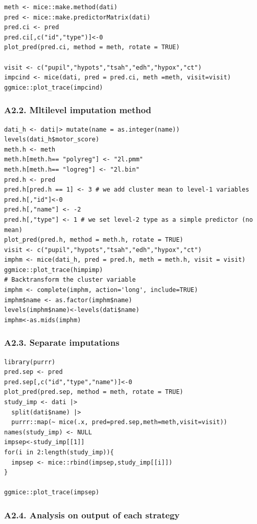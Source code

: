 \documentclass[
  article]{jss}
\begin{document}
\begin{verbatim}
meth <- mice::make.method(dati)
pred <- mice::make.predictorMatrix(dati)
pred.ci <- pred
pred.ci[,c("id","type")]<-0
plot_pred(pred.ci, method = meth, rotate = TRUE) 

visit <- c("pupil","hypots","tsah","edh","hypox","ct")
impcind <- mice(dati, pred = pred.ci, meth =meth, visit=visit)
ggmice::plot_trace(impcind)
\end{verbatim}

\subsubsection{A2.2. Mltilevel imputation
method}\label{a2.2.-mltilevel-imputation-method}

\begin{verbatim}
dati_h <- dati|> mutate(name = as.integer(name))
levels(dati_h$motor_score)
meth.h <- meth
meth.h[meth.h== "polyreg"] <- "2l.pmm"
meth.h[meth.h== "logreg"] <- "2l.bin"
pred.h <- pred
pred.h[pred.h == 1] <- 3 # we add cluster mean to level-1 variables
pred.h[,"id"]<-0
pred.h[,"name"] <- -2
pred.h[,"type"] <- 1 # we set level-2 type as a simple predictor (no mean)
plot_pred(pred.h, method = meth.h, rotate = TRUE) 
visit <- c("pupil","hypots","tsah","edh","hypox","ct")
imphm <- mice(dati_h, pred = pred.h, meth = meth.h, visit = visit)
ggmice::plot_trace(himpimp)
# Backtransform the cluster variable
imphm <- complete(imphm, action='long', include=TRUE)
imphm$name <- as.factor(imphm$name)
levels(imphm$name)<-levels(dati$name)
imphm<-as.mids(imphm)
\end{verbatim}

\subsubsection{A2.3. Separate
imputations}\label{a2.3.-separate-imputations}

\begin{verbatim}
library(purrr)
pred.sep <- pred
pred.sep[,c("id","type","name")]<-0
plot_pred(pred.sep, method = meth, rotate = TRUE) 
study_imp <- dati |> 
  split(dati$name) |> 
  purrr::map(~ mice(.x, pred=pred.sep,meth=meth,visit=visit))
names(study_imp) <- NULL
impsep<-study_imp[[1]]
for(i in 2:length(study_imp)){
  impsep <- mice::rbind(impsep,study_imp[[i]])
}

ggmice::plot_trace(impsep)
\end{verbatim}

\subsubsection{A2.4. Analysis on output of each
strategy}\label{a2.4.-analysis-on-output-of-each-strategy}
\end{document}

